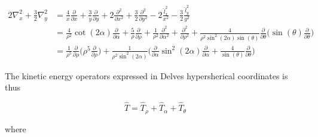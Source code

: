 \documentclass{article}
\begin{document}
\begin{subequations}
\begin{align*}
	2\nabla^{2}_{x} + \frac{3}{2}\nabla^{2}_{y} &= \frac{4}{x}\frac{\partial}{\partial x} +  \frac{3}{y} \frac{\partial}{\partial y}  +2\frac{\partial^2}{\partial x^{2}} + \frac{3}{2} \frac{\partial^2}{\partial y^{2}} - 2\frac{\hat{l}^{2}_{x}}{x^2} - \frac{3}{2}\frac{\hat{l}^{2}_{y}}{y^2}\\
									&= \frac{4}{\rho^2} \cot(2\alpha) \frac{\partial}{\partial\alpha} + \frac{5}{\rho} \frac{\partial}{\partial\rho} + \frac{1}{\rho^2} \frac{\partial^2}{\partial\alpha^2} + \frac{\partial^2}{\partial\rho^2} + \frac{4}{\rho^2 \sin^2(2\alpha)\sin(\theta)} \frac{\partial}{\partial\theta} \Big( \sin(\theta) \frac{\partial}{\partial{\theta}} \Big)\\
									&= \frac{1}{\rho^5}\frac{\partial}{\partial\rho} \Big( \rho^5 \frac{\partial}{\partial\rho} \Big) + \frac{1}{\rho^2 \sin^2(2\alpha)}  \Big( \frac{\partial}{\partial\alpha} \sin^2(2\alpha) \frac{\partial}{\partial\alpha} + \frac{4}{\sin(\theta)} \frac{\partial}{\partial\theta} \Big)
\end{align*}
\end{subequations}

The kinetic energy operators expressed in Delves hypersherical coordinates is thus

\begin{equation}
\hat{T} = \hat{T}_{\rho} +  \hat{T}_{\alpha}+\hat{T}_{\theta} 
\end{equation}

where
\end{document}
